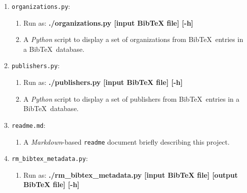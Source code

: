 \begin{enumerate}
\begin{enumerate}
	\item guidelines: \vspace{-0.2cm}
		\begin{enumerate} \itemsep -2pt
		\item A document containing a set of guidelines on how to collaborate with me.
		\end{enumerate}
	\item report: \vspace{-0.2cm}
		\begin{enumerate} \itemsep -2pt
		\item This document that describes the organization of the {\sc Bib}\TeX\ {\it Analytics} repository, the software architecture of the {\sc Bib}\TeX\ {\it Analytics} software, and future work of the {\sc Bib}\TeX\ {\it Analytics} project.
		\end{enumerate}
	\end{enumerate}
\item {\tt organizations.py}: \vspace{-0.3cm}
	\begin{enumerate} \itemsep -2pt
	\item Run as: {\bf ./organizations.py [input BibTeX file] [-h]}
	\item A {\it Python} script to display a set of organizations from {\sc Bib}\TeX\ entries in a {\sc Bib}\TeX\ database.
	\end{enumerate}
\item {\tt publishers.py}: \vspace{-0.3cm}
	\begin{enumerate} \itemsep -2pt
	\item Run as: {\bf ./publishers.py [input BibTeX file] [-h]}
	\item A {\it Python} script to display a set of publishers from {\sc Bib}\TeX\ entries in a {\sc Bib}\TeX\ database.
	\end{enumerate}
\item {\tt readme.md}: \vspace{-0.3cm}
	\begin{enumerate} \itemsep -2pt
	\item A {\it Markdown}-based {\tt readme} document briefly describing this project.
	\end{enumerate}
\item {\tt rm\_bibtex\_metadata.py}: \vspace{-0.3cm}
	\begin{enumerate} \itemsep -2pt
	\item Run as: {\bf ./rm\_bibtex\_metadata.py [input BibTeX file] [output BibTeX file] [-h]}

\end{enumerate}
\end{enumerate}

